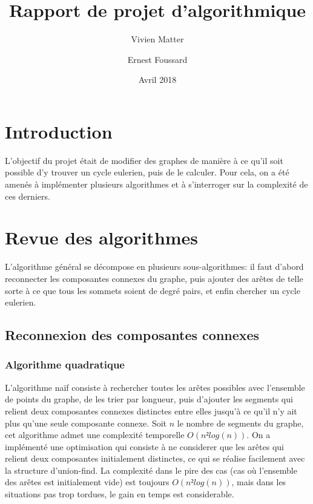 \documentclass[a4paper,11pt]{article}
\title{Rapport de projet d'algorithmique}
\author{Vivien Matter \and Ernest Foussard}
\date{Avril 2018}
\begin{document}
\maketitle

\tableofcontents

\newpage

\section{Introduction}

L'objectif du projet était de modifier des graphes de manière à ce qu'il soit
possible d'y trouver un cycle eulerien, puis de le calculer. Pour cela, on a été amenés
à implémenter plusieurs algorithmes et à s'interroger sur la complexité de ces derniers.

\section{Revue des algorithmes}

L'algorithme général se décompose en plusieurs sous-algorithmes: il faut d'abord reconnecter
les composantes connexes du graphe, puis ajouter des arêtes de telle sorte à ce que tous les
sommets soient de degré pairs, et enfin chercher un cycle eulerien.

\subsection{Reconnexion des composantes connexes}

\subsubsection{Algorithme quadratique}

L'algorithme naïf consiste à rechercher toutes les arêtes possibles avec l'ensemble de points
du graphe, de les trier par longueur, puis d'ajouter les segments qui relient deux composantes
connexes distinctes entre elles jusqu'à ce qu'il n'y ait plus qu'une seule composante connexe.
Soit $n$ le nombre de segments du graphe, cet algorithme admet une complexité temporelle $O(n²log(n))$.
On a implémenté une optimisation qui consiste à ne considerer que les arêtes qui relient deux composantes
initialement distinctes, ce qui se réalise facilement avec la structure d'union-find. La complexité dans
le pire des cas (cas où l'ensemble des arêtes est initialement vide) est toujours $O(n²log(n))$, mais
dans les situations pas trop tordues, le gain en temps est considerable.
\end{document}
